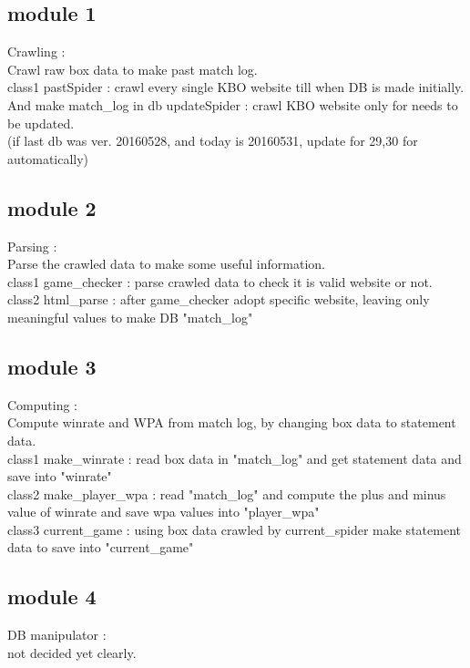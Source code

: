 \documentclass[conference,compsoc, twocolumn]{IEEEtran}
\begin{document}
\subsection{module 1}
Crawling : \\
Crawl raw box data to make past match log. \\
class1 pastSpider : crawl every single KBO website till when DB is made initially. \\
And make match\_log in db updateSpider : crawl KBO website only for needs to be updated.\\
(if last db was ver. 20160528, and today is 20160531, update for 29,30 for automatically)

\subsection{module 2} 
Parsing : \\
Parse the crawled data to make some useful information. \\
class1 game\_checker : parse crawled data to check it is valid website or not. \\ 
class2 html\_parse : after game\_checker adopt specific website, leaving only meaningful values to make DB "match\_log" \\

\subsection{module 3}
Computing : \\  
Compute winrate and WPA from match log, by changing box data to statement data. \\ 
class1 make\_winrate : read box data in "match\_log" and get statement data and save into "winrate" \\  
class2 make\_player\_wpa : read "match\_log" and compute the plus and minus value of winrate and save wpa values into "player\_wpa"\\
class3 current\_game  : using box data crawled by current\_spider make statement data to save into "current\_game"
 

\subsection{module 4}
DB manipulator : \\ 
not decided yet clearly. \\
\end{document}
